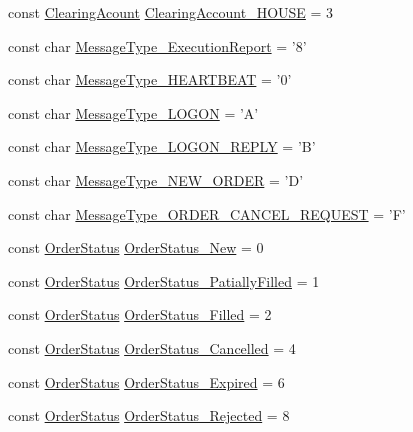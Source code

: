 \begin{DoxyCompactItemize}
const \hyperlink{namespaceMetal_1_1LSE_ae1f2b67d6be84798adfd29525ee0a697}{Clearing\+Acount} \hyperlink{namespaceMetal_1_1LSE_a609840f269ebc18cb59e3465d3a7ce8c}{Clearing\+Account\+\_\+\+H\+O\+U\+S\+E} = 3
\item 
const char \hyperlink{namespaceMetal_1_1LSE_a063c1f76d6ceff9047e72129fb41794f}{Message\+Type\+\_\+\+Execution\+Report} = '8'
\item 
const char \hyperlink{namespaceMetal_1_1LSE_a8ecb5abd26dd04729d41bc06fcc160f7}{Message\+Type\+\_\+\+H\+E\+A\+R\+T\+B\+E\+A\+T} = '0'
\item 
const char \hyperlink{namespaceMetal_1_1LSE_a33f70c928e9fbed5add48f6d2a95d054}{Message\+Type\+\_\+\+L\+O\+G\+O\+N} = 'A'
\item 
const char \hyperlink{namespaceMetal_1_1LSE_a6afb8507fedf49e6f5b538bda1d3317d}{Message\+Type\+\_\+\+L\+O\+G\+O\+N\+\_\+\+R\+E\+P\+L\+Y} = 'B'
\item 
const char \hyperlink{namespaceMetal_1_1LSE_ab0af23df4cdab59633235159fea1ff48}{Message\+Type\+\_\+\+N\+E\+W\+\_\+\+O\+R\+D\+E\+R} = 'D'
\item 
const char \hyperlink{namespaceMetal_1_1LSE_a737fced5b178f3eae24d9bd9b27b804d}{Message\+Type\+\_\+\+O\+R\+D\+E\+R\+\_\+\+C\+A\+N\+C\+E\+L\+\_\+\+R\+E\+Q\+U\+E\+S\+T} = 'F'
\item 
const \hyperlink{namespaceMetal_1_1LSE_aaa5d42acc71915dbdbc74bf7b7db958e}{Order\+Status} \hyperlink{namespaceMetal_1_1LSE_ad542efa8a02f99fc9a173c8b8b9aa4ac}{Order\+Status\+\_\+\+New} = 0
\item 
const \hyperlink{namespaceMetal_1_1LSE_aaa5d42acc71915dbdbc74bf7b7db958e}{Order\+Status} \hyperlink{namespaceMetal_1_1LSE_abdf55f340dddb1aa7b2ed7df2c412273}{Order\+Status\+\_\+\+Patially\+Filled} = 1
\item 
const \hyperlink{namespaceMetal_1_1LSE_aaa5d42acc71915dbdbc74bf7b7db958e}{Order\+Status} \hyperlink{namespaceMetal_1_1LSE_ae230547018dfcd71a8c6dd11a7986c95}{Order\+Status\+\_\+\+Filled} = 2
\item 
const \hyperlink{namespaceMetal_1_1LSE_aaa5d42acc71915dbdbc74bf7b7db958e}{Order\+Status} \hyperlink{namespaceMetal_1_1LSE_a9e1f0bac9d6e0df6416ebc4bad1d6dd8}{Order\+Status\+\_\+\+Cancelled} = 4
\item 
const \hyperlink{namespaceMetal_1_1LSE_aaa5d42acc71915dbdbc74bf7b7db958e}{Order\+Status} \hyperlink{namespaceMetal_1_1LSE_aea7b1ba047539f98d66882aa6f67640b}{Order\+Status\+\_\+\+Expired} = 6
\item 
const \hyperlink{namespaceMetal_1_1LSE_aaa5d42acc71915dbdbc74bf7b7db958e}{Order\+Status} \hyperlink{namespaceMetal_1_1LSE_a7bb9b804174d716e32b49871dedd9c85}{Order\+Status\+\_\+\+Rejected} = 8

\end{DoxyCompactItemize}
